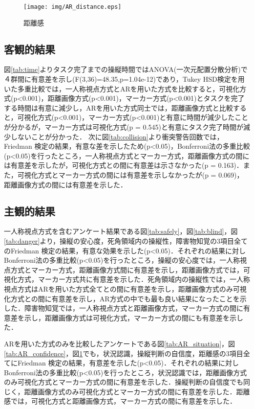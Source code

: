\documentclass
[a4paper,11pt]{jreport}
\begin{document}
\begin{figure}[bt]
	\begin{center}
    \texttt{[image: img/AR\_distance.eps]}
    \caption{距離感}
    \label{tab:AR_distance}
    \end{center}
\end{figure}

\clearpage
\subsection{客観的結果}
図\ref{tab:time}よりタスク完了までの操縦時間ではANOVA(一次元配置分散分析)で４群間に有意差を示し(F(3,36)=48.35,p=1.04e-12)であり，Tukey HSD検定を用いた多重比較では，一人称視点方式とARを用いた方式を比較すると，可視化方式(p<0.001)，距離画像方式(p<0.001)，マーカー方式(p<0.001)とタスクを完了する時間は有意に減少し，ARを用いた方式同士では，距離画像方式と比較すると，可視化方式(p<0.001)，マーカー方式(p<0.001)と有意に時間が減少したことが分かるが，マーカー方式は可視化方式(p = 0.545)と有意にタスク完了時間が減少しないことが分かった．
次に図\ref{tab:collision}より衝突警告回数では，Friedman 検定の結果，有意な差を示したため(p<0.05)，Bonferroni法の多重比較(p<0.05)を行ったところ，一人称視点方式とマーカー方式，距離画像方式の間には有意差を示したが，可視化方式との間に有意差は示さなかった(p = 0.163)．また，可視化方式とマーカー方式の間には有意差を示しなかったが(p = 0.069)，距離画像方式の間には有意差を示した．

\subsection{主観的結果}
一人称視点方式を含むアンケート結果である図\ref{tab:safely}，図\ref{tab:blind}，図\ref{tab:danger}より，操縦の安心度，死角領域内の操縦性，障害物知覚の3項目全てのFriedman 検定の結果，有意な効果を示した(p<0.05)．それぞれの結果に対しBonferroni法の多重比較(p<0.05)を行ったところ，操縦の安心度では，一人称視点方式とマーカー方式，距離画像方式間に有意差を示し，距離画像方式では，可視化方式，マーカー方式共に有意差を示した．死角領域内の操縦性では，一人称視点方式はARを用いた方式全てとの間に有意差を示し，距離画像方式のみ可視化方式との間に有意差を示し，AR方式の中でも最も良い結果になったことを示した．障害物知覚では，一人称視点方式と距離画像方式，マーカー方式の間に有意差を示し，距離画像方式は可視化方式，マーカー方式の間にも有意差を示した．
\par
ARを用いた方式のみを比較したアンケートである図\ref{tab:AR_situation}，図\ref{tab:AR_confidence}，図\ref{tab:AR_distance}でも，状況認識，操縦判断の自信度，距離感の3項目全てにFriedman 検定の結果，有意差を示した(p<0.05)．それぞれの結果に対しBonferroni法の多重比較(p<0.05)を行ったところ，状況認識では，距離画像方式のみ可視化方式とマーカー方式の間に有意差を示した．操縦判断の自信度でも同じく，距離画像方式のみ可視化方式とマーカー方式の間に有意差を示した．距離感では，可視化方式と距離画像方式，マーカー方式の間に有意差を示した．
\end{document}
